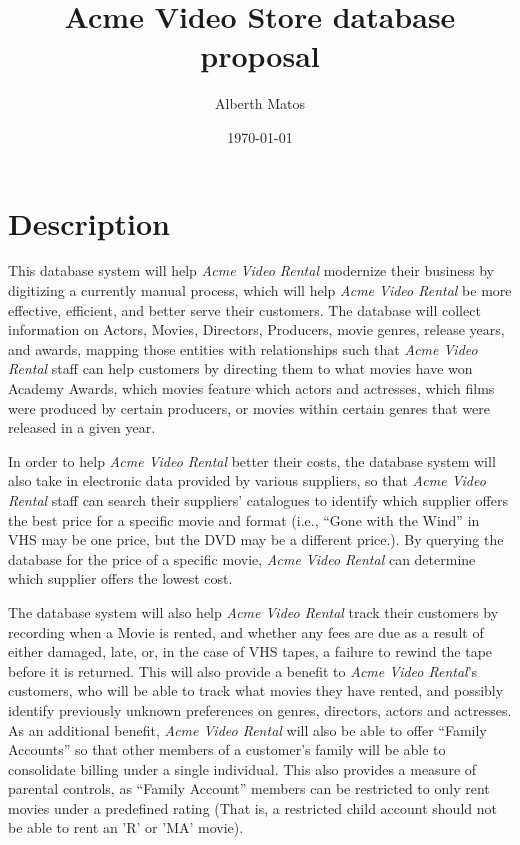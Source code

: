\documentclass[letterpaper,12pt]{article}
\title{\large{Acme Video Store database proposal}}
\author{Alberth Matos}
\date{\today}
\begin{document}
\fancyhead{}

\maketitle

\section{Description}
This database system will help \emph{Acme Video Rental} modernize their business by digitizing a currently manual process, which will help \emph{Acme Video Rental} be more effective, efficient, and better serve their customers.  The database will collect information on Actors, Movies, Directors, Producers, movie genres, release years, and awards, mapping those entities with relationships such that \emph{Acme Video Rental} staff can help customers by directing them to what movies have won Academy Awards, which movies feature which actors and actresses, which films were produced by certain producers, or movies within certain genres that were released in a given year.

In order to help \emph{Acme Video Rental} better their costs, the database system will also take in electronic data provided by various suppliers, so that \emph{Acme Video Rental} staff can search their suppliers' catalogues to identify which supplier offers the best price for a specific movie and format (i.e., ``Gone with the Wind'' in VHS may be one price, but the DVD may be a different price.).  By querying the database for the price of a specific movie, \emph{Acme Video Rental} can determine which supplier offers the lowest cost.

The database system will also help \emph{Acme Video Rental} track their customers by recording when a Movie is rented, and whether any fees are due as a result of either damaged, late, or, in the case of VHS tapes, a failure to rewind the tape before it is returned.  This will also provide a benefit to \emph{Acme Video Rental}'s customers, who will be able to track what movies they have rented, and possibly identify previously unknown preferences on genres, directors, actors and actresses.  As an additional benefit, \emph{Acme Video Rental} will also be able to offer ``Family Accounts'' so that other members of a customer's family will be able to consolidate billing under a single individual.  This also provides a measure of parental controls, as ``Family Account'' members can be restricted to only rent movies under a predefined rating (That is, a restricted child account should not be able to rent an 'R' or 'MA' movie).
\end{document}
